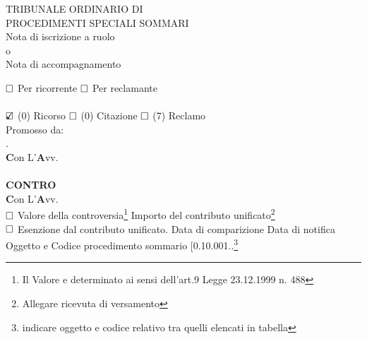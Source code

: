 \documentclass[a4paper,12pt,twoside,openright]{book}
\begin{document}
\begin{center}
\LARGE{TRIBUNALE ORDINARIO DI}\hrulefill \\
\vspace*{0.5cm}
\normalsize{PROCEDIMENTI SPECIALI SOMMARI}\\
\vspace*{0.5cm}
\LARGE{Nota di iscrizione a ruolo\\
o\\
Nota di accompagnamento}\\
\end{center}
$\text{\rlap{}}\square$
Per ricorrente	
\hspace{1.0cm}		
$\text{\rlap{}}\square$
Per reclamante\vspace{0.5cm}\\
\vspace{0.5cm}\\
$\text{\rlap{$\checkmark$}}\square$
(0) Ricorso
\hspace{1.5cm}		
$\text{\rlap{}}\square$
(0) Citazione 
\hspace{1.5cm}	
$\text{\rlap{}}\square$
(7) Reclamo\vspace*{0.5cm}\\
\tiny{Promosso da:}\\
.\dotfill\\
\textbf{C}\tiny{on L'}\textbf{A}\tiny{vv.}  \hspace{3cm}\dotfill\\
\dotfill\\
\textbf{C}\tiny{\textbf{ONTRO}}
\dotfill \\
\textbf{C}\tiny{on L'}\textbf{A}\tiny{vv.}  \dotfill \vspace{1cm}\\
\normalsize$\text{\rlap{}}\square$ Valore della controversia\footnote{Il Valore e determinato ai sensi dell'art.9 Legge 23.12.1999 n. 488 }\dotfill 
Importo del contributo unificato\footnotemark[1]\footnote{Allegare ricevuta di versamento}\dotfill\vspace{1cm} \\
$\text{\rlap{}}\square$ Esenzione dal contributo unificato.
Data di comparizione \hrulefill 
Data di notifica \hrulefill\\
Oggetto e Codice  procedimento sommario [0.10.001..\footnote{indicare oggetto e codice relativo tra quelli elencati in tabella}\\
\end{document}
